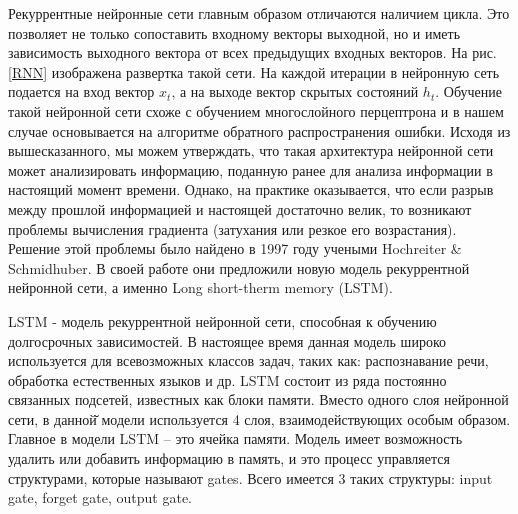     Рекуррентные нейронные сети главным образом отличаются наличием цикла. Это позволяет не только сопоставить входному векторы выходной, но и иметь зависимость выходного вектора от всех предыдущих входных векторов. На рис. \ref{RNN} изображена развертка такой сети. На каждой итерации в нейронную сеть подается на вход вектор $x_{t}$, а на выходе вектор скрытых состояний $h_{t}$.
    Обучение такой нейронной сети схоже с обучением многослойного перцептрона и в нашем случае основывается на алгоритме обратного распространения ошибки. Исходя из вышесказанного, мы можем утверждать, что такая архитектура нейронной сети может анализировать информацию, поданную ранее для анализа информации в настоящий момент времени. Однако, на практике оказывается, что если разрыв между прошлой информацией и настоящей достаточно велик, то возникают проблемы вычисления градиента (затухания или резкое его возрастания). Решение этой проблемы было найдено в 1997 году учеными Hochreiter & Schmidhuber. В своей работе они предложили новую модель рекуррентной нейронной сети, а именно Long short-therm memory (LSTM).

    LSTM - модель рекуррентной нейронной сети, способная к обучению долгосрочных зависимостей. В настоящее время данная модель широко используется для всевозможных классов задач, таких как: распознавание речи, обработка естественных языков и др. LSTM состоит из ряда постоянно связанных подсетей, известных как блоки памяти. Вместо одного слоя нейронной сети, в данной̆ модели используется 4 слоя, взаимодействующих особым образом. Главное в модели LSTM – это ячейка памяти. Модель имеет возможность удалить или добавить информацию в память, и это процесс управляется структурами, которые называют gates. Всего имеется 3 таких структуры: input gate, forget gate, output gate.
    
